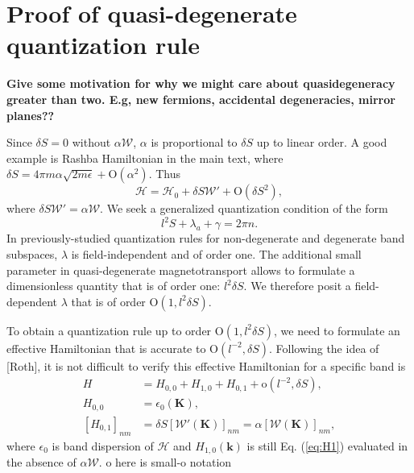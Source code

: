 \documentclass[aps, prb, showpacs, twocolumn, notitlepage, superscriptaddress]{revtex4-1}
\begin{document}
\section{Proof of quasi-degenerate quantization rule\label{app:quantizationruleproof}}

\textbf{Give some motivation for why we might care about quasidegeneracy greater than two. E.g, new fermions, accidental degeneracies, mirror planes??}

Since $\delta S=0$ without $\alpha\mathcal{W}$, $\alpha$ is proportional to $\delta S$ up to linear order. A good example is Rashba Hamiltonian in the main text, where $\delta S=4\pi m\alpha\sqrt{2m\epsilon}+\text{O}(\alpha^2).$  Thus 
\begin{equation}
\mathcal{H}=
\mathcal{H}_0+\delta S \mathcal{W}'+\text{O}(\delta S^2),
\end{equation}
where $\delta S \mathcal{W}'=\alpha \mathcal{W}$.
We seek a generalized quantization condition of the form 
\begin{equation}
l^{2}S+\lambda_{a}+\gamma=2\pi n.
\end{equation}
In previously-studied quantization rules for non-degenerate and degenerate band subspaces, $\lambda$ is field-independent and of order one. The additional small parameter in quasi-degenerate magnetotransport allows to formulate a dimensionless quantity that is of order one: $l^2\delta S$. We therefore posit a field-dependent $\lambda$ that is  of order $\text{O}(1,l^2\delta S)$.

To obtain a quantization rule up to order $\text{O}(1,l^2\delta S)$, we need to formulate an effective Hamiltonian that is accurate to $\text{O}(l^{-2},\delta S)$.  Following the
idea of [Roth], it is not difficult to verify this effective Hamiltonian for a specific band is 
\begin{align}
H &= H_{0,0}+H_{1,0}+H_{0,1}+\text{o}(l^{-2}, \delta S),\\
H_{0, 0}&=\epsilon_0(\boldsymbol{K}),\\
[H_{0, 1}]_{nm}&=\delta S [\mathcal{W}'(\boldsymbol{K})]_{nm} = \alpha [\mathcal{W}(\boldsymbol{K})]_{nm},
\end{align}
where $\epsilon_0$ is band dispersion of $\mathcal{H}$ and $H_{1,0}(\boldsymbol{k})$ is still Eq. (\ref{eq:H1}) evaluated in the absence of $\alpha\mathcal{W}$. $\text{o}$ here is small-o notation
\end{document}
